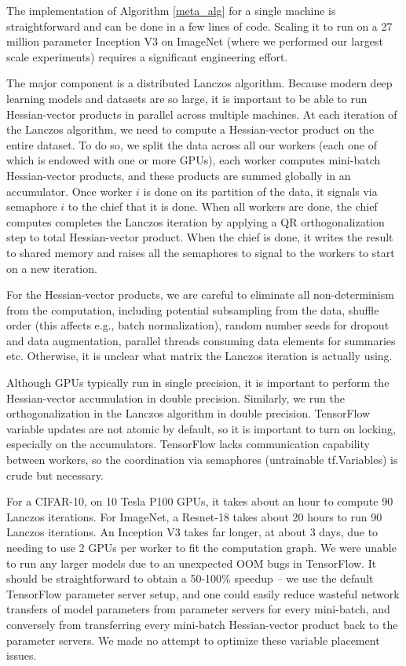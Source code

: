 \documentclass{article}
\begin{document}
The implementation of Algorithm \ref{meta_alg} for a single machine is straightforward and can be done in a few lines of code. Scaling it to run on a 27 million parameter Inception V3 \cite{szegedy2016rethinking} on ImageNet (where we performed our largest scale experiments) requires a significant engineering effort.

The major component is a distributed Lanczos algorithm. Because modern deep learning models and datasets are so large, it is important to be able to run Hessian-vector products in parallel across multiple machines. At each iteration of the Lanczos algorithm, we need to compute a Hessian-vector product on the entire dataset. To do so, we split the data across all our workers (each one of which is endowed with one or more GPUs), each worker computes mini-batch Hessian-vector products, and these products are summed globally in an accumulator. Once worker $i$ is done on its partition of the data, it signals via semaphore $i$ to the chief that it is done. When all workers are done, the chief computes completes the Lanczos iteration by applying a QR orthogonalization step to total Hessian-vector product. When the chief is done, it writes the result to shared memory and raises all the semaphores to signal to the workers to start on a new iteration.

For the Hessian-vector products, we are careful to eliminate all non-determinism from the computation, including potential subsampling from the data, shuffle order (this affects e.g., batch normalization), random number seeds for dropout and data augmentation, parallel threads consuming data elements for summaries etc. Otherwise, it is  unclear what matrix the Lanczos iteration is actually using.

Although GPUs typically run in single precision, it is important to perform the Hessian-vector accumulation in double precision. Similarly, we run the orthogonalization in the Lanczos algorithm in double precision. TensorFlow variable updates are not atomic by default, so it is important to turn on locking, especially on the accumulators. TensorFlow lacks communication capability between workers, so the coordination via semaphores (untrainable tf.Variables) is crude but necessary.

For a CIFAR-10, on 10 Tesla P100 GPUs, it takes about an hour to compute 90 Lanczos iterations. For ImageNet, a Resnet-18 takes about 20 hours to run 90 Lanczos iterations. An Inception V3 takes far longer, at about 3 days, due to needing to use 2 GPUs per worker to fit the computation graph. We were unable to run any larger models due to an unexpected OOM bugs in TensorFlow. It should be straightforward to obtain a 50-100\% speedup -- we use the default TensorFlow parameter server setup, and one could easily reduce wasteful network transfers of model parameters  from parameter servers for every mini-batch, and conversely from transferring every mini-batch Hessian-vector product back to the parameter servers. We made no attempt to optimize these variable placement issues.
\end{document}
